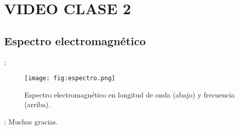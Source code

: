 \section{VIDEO CLASE 2}
\subsection{Espectro electromagnético}
\begin{frame}{\secname : \subsecname}
  \begin{figure}
    \centering
    \texttt{[image: fig:espectro.png]}
    \caption{Espectro electromagnético en longitud de onda (abajo) y frecuencia (arriba).}
    \label{}
  \end{figure}
\end{frame}


\begin{frame}{\secname : \subsecname}
Muchas gracias.
\end{frame}
